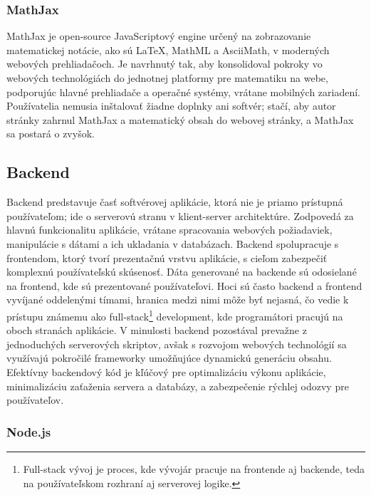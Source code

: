 \subsubsection{MathJax}
MathJax \cite{MathJax} je open-source JavaScriptový engine určený na zobrazovanie matematickej notácie, ako sú LaTeX, MathML a AsciiMath, v moderných webových prehliadačoch.
Je navrhnutý tak, aby konsolidoval pokroky vo webových technológiách do jednotnej platformy pre matematiku na webe, podporujúc hlavné prehliadače a operačné systémy, vrátane mobilných zariadení.
Používatelia nemusia inštalovať žiadne doplnky ani softvér; stačí, aby autor stránky zahrnul MathJax a matematický obsah do webovej stránky, a MathJax sa postará o zvyšok.



\subsection{Backend}
Backend predstavuje časť softvérovej aplikácie, ktorá nie je priamo prístupná používateľom; ide o serverovú stranu v klient-server architektúre.
 Zodpovedá za hlavnú funkcionalitu aplikácie, vrátane spracovania webových požiadaviek, manipulácie s dátami a ich ukladania v databázach. Backend spolupracuje s frontendom, ktorý tvorí prezentačnú vrstvu aplikácie, s cieľom zabezpečiť komplexnú používateľskú skúsenosť. 
 Dáta generované na backende sú odosielané na frontend, kde sú prezentované používateľovi.
  Hoci sú často backend a frontend vyvíjané oddelenými tímami, hranica medzi nimi môže byť nejasná, čo vedie k prístupu známemu ako full-stack\footnote{Full-stack vývoj je proces, kde vývojár pracuje na frontende aj backende, teda na používateľskom rozhraní aj serverovej logike.} development, kde programátori pracujú na oboch stranách aplikácie.
   V minulosti backend pozostával prevažne z jednoduchých serverových skriptov, avšak s rozvojom webových technológií sa využívajú pokročilé frameworky umožňujúce dynamickú generáciu obsahu.
 Efektívny backendový kód je kľúčový pre optimalizáciu výkonu aplikácie, minimalizáciu zaťaženia servera a databázy, a zabezpečenie rýchlej odozvy pre používateľov. \cite{backend} 
 
\subsubsection{Node.js}
